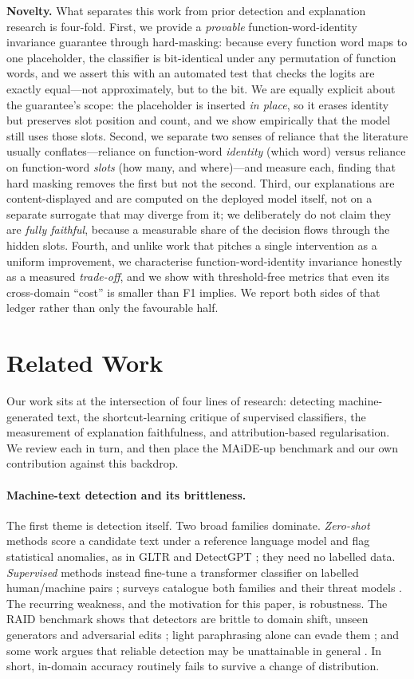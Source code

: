 \documentclass[10pt,twocolumn]{article}
\begin{document}
\noindent\textbf{Novelty.} What separates this work from prior detection and explanation research is four-fold. First, we provide a \emph{provable} function-word-identity invariance guarantee through hard-masking: because every function word maps to one placeholder, the classifier is bit-identical under any permutation of function words, and we assert this with an automated test that checks the logits are exactly equal---not approximately, but to the bit. We are equally explicit about the guarantee's scope: the placeholder is inserted \emph{in place}, so it erases identity but preserves slot position and count, and we show empirically that the model still uses those slots. Second, we separate two senses of reliance that the literature usually conflates---reliance on function-word \emph{identity} (which word) versus reliance on function-word \emph{slots} (how many, and where)---and measure each, finding that hard masking removes the first but not the second. Third, our explanations are content-displayed and are computed on the deployed model itself, not on a separate surrogate that may diverge from it; we deliberately do not claim they are \emph{fully faithful}, because a measurable share of the decision flows through the hidden slots. Fourth, and unlike work that pitches a single intervention as a uniform improvement, we characterise function-word-identity invariance honestly as a measured \emph{trade-off}, and we show with threshold-free metrics that even its cross-domain ``cost'' is smaller than F1 implies. We report both sides of that ledger rather than only the favourable half.

\section{Related Work}
Our work sits at the intersection of four lines of research: detecting machine-generated text, the shortcut-learning critique of supervised classifiers, the measurement of explanation faithfulness, and attribution-based regularisation. We review each in turn, and then place the MAiDE-up benchmark and our own contribution against this backdrop.

\paragraph{Machine-text detection and its brittleness.}
The first theme is detection itself. Two broad families dominate. \emph{Zero-shot} methods score a candidate text under a reference language model and flag statistical anomalies, as in GLTR \cite{gltr} and DetectGPT \cite{detectgpt}; they need no labelled data. \emph{Supervised} methods instead fine-tune a transformer classifier on labelled human/machine pairs \cite{roberta,solaiman}; surveys catalogue both families and their threat models \cite{crothers}. The recurring weakness, and the motivation for this paper, is robustness. The RAID benchmark shows that detectors are brittle to domain shift, unseen generators and adversarial edits \cite{raid}; light paraphrasing alone can evade them \cite{krishna}; and some work argues that reliable detection may be unattainable in general \cite{sadasivan}. In short, in-domain accuracy routinely fails to survive a change of distribution.
\end{document}
